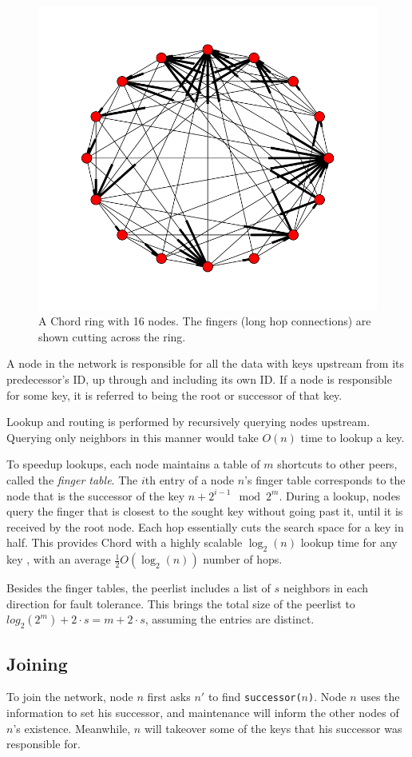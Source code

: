 \begin{figure}
	\centering
	\includegraphics[width=0.45\linewidth]{figs/chord}
	\caption{A Chord ring with 16 nodes.  The fingers (long hop connections) are shown cutting across the ring.}
	\label{fig:chord}
\end{figure}



A node in the network is responsible for all the data with keys upstream from its predecessor's ID, up through and including its own ID.  
If a node is responsible for some key, it is referred to being the root or successor of that key.

Lookup and routing is performed by recursively querying nodes upstream.
Querying only neighbors in this manner would take $O(n)$ time to lookup a key.


To speedup lookups, each node maintains a table of $m$ shortcuts to other peers, called the \textit{finger table}.
The $i$th entry of a node $n$'s finger table corresponds to the node that is the successor of the key $n+2^{i-1} \mod 2^m $.  
During a lookup,  nodes query the finger that is closest to the sought key without going past it, until it is received by the root node.
Each hop essentially cuts the search space for a key in half.
This provides Chord with a highly scalable $\log_2(n)$ lookup time for any key \cite{chord}, with an average $\frac{1}{2}O(\log_{2}(n))$ number of hops.

Besides the finger tables, the peerlist includes a list of $s$ neighbors in each direction for fault tolerance.
This brings the total size of the peerlist to $log_{2}(2^{m})  + 2 \cdot s =  m  + 2 \cdot s$, assuming the entries are distinct.

\subsection*{Joining}
To join the network, node $n$ first asks $n'$ to find \texttt{successor($ n $)}. 
Node $n$ uses the information to set his successor, and maintenance will inform the other nodes of $n$'s existence.
Meanwhile, $n$ will takeover some of the keys that his successor was responsible for.

